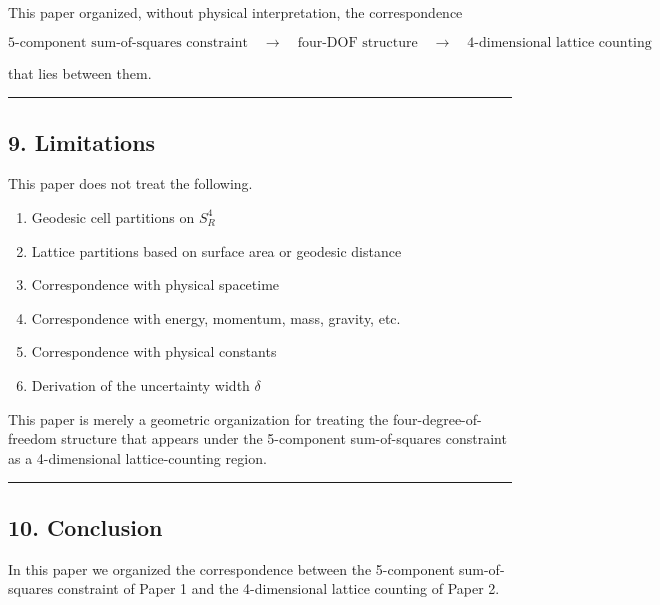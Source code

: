 \documentclass[
]{article}
\providecommand{\tightlist}{%
  \setlength{\itemsep}{0pt}\setlength{\parskip}{0pt}}
\begin{document}
This paper organized, without physical interpretation, the
correspondence

\[
\text{5-component sum-of-squares constraint}
\quad\longrightarrow\quad
\text{four-DOF structure}
\quad\longrightarrow\quad
\text{4-dimensional lattice counting}
\]

that lies between them.

\begin{center}\rule{0.5\linewidth}{0.5pt}\end{center}

\subsection{9. Limitations}\label{limitations}

This paper does not treat the following.

\begin{enumerate}
\def\labelenumi{\arabic{enumi}.}
\tightlist
\item
  Geodesic cell partitions on \(S^4_R\)\\
\item
  Lattice partitions based on surface area or geodesic distance\\
\item
  Correspondence with physical spacetime\\
\item
  Correspondence with energy, momentum, mass, gravity, etc.\\
\item
  Correspondence with physical constants\\
\item
  Derivation of the uncertainty width \(\delta\)
\end{enumerate}

This paper is merely a geometric organization for treating the
four-degree-of-freedom structure that appears under the 5-component
sum-of-squares constraint as a 4-dimensional lattice-counting region.

\begin{center}\rule{0.5\linewidth}{0.5pt}\end{center}

\subsection{10. Conclusion}\label{conclusion}

In this paper we organized the correspondence between the 5-component
sum-of-squares constraint of Paper 1 and the 4-dimensional lattice
counting of Paper 2.
\end{document}

